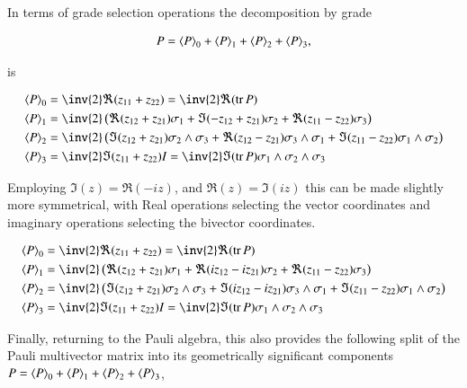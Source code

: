 \documentclass{article}
\DeclareMathOperator{\tr}{tr}
\newcommand{\trace}[1]{\tr{#1}}
\begin{document}
In terms of grade selection operations the decomposition by grade

\begin{align*}
P = {\left\langle{{P}}\right\rangle}_{0} +{\left\langle{{P}}\right\rangle}_{1} +{\left\langle{{P}}\right\rangle}_{2} +{\left\langle{{P}}\right\rangle}_{3},
\end{align*}

is

\begin{align*}
\gpgradezero{P} &= \inv{2} \Re( z_{11} + z_{22} ) = \inv{2} \Re(\trace P) \\
\gpgradeone{P} &= \inv{2} \left(
\Re( z_{12} + z_{21} ) \sigma_1
+\Im( -z_{12} + z_{21} ) \sigma_2
+\Re( z_{11} - z_{22} ) \sigma_3
\right) \\
\gpgradetwo{P}
&= \inv{2} \left(
\Im( z_{12} + z_{21} ) \sigma_2 \wedge \sigma_3
+\Re( z_{12} - z_{21} ) \sigma_3 \wedge \sigma_1
+\Im( z_{11} - z_{22} ) \sigma_1 \wedge \sigma_2
\right) \\
\gpgradethree{P} &= \inv{2} \Im( z_{11} + z_{22} ) I = \inv{2} \Im(\trace P) \sigma_1 \wedge \sigma_2 \wedge \sigma_3
\end{align*}

Employing $\Im(z) = \Re(-iz)$, and $\Re(z) = \Im(iz)$ this can be made slightly more symmetrical, with Real operations
selecting the vector coordinates and imaginary operations selecting the bivector coordinates.

\begin{align*}
\gpgradezero{P} &= \inv{2} \Re( z_{11} + z_{22} ) = \inv{2} \Re(\trace P) \\
\gpgradeone{P} &= \inv{2} \left(
\Re( z_{12} + z_{21} ) \sigma_1
+\Re( iz_{12} - iz_{21} ) \sigma_2
+\Re( z_{11} - z_{22} ) \sigma_3
\right) \\
\gpgradetwo{P}
&= \inv{2} \left(
\Im( z_{12} + z_{21} ) \sigma_2 \wedge \sigma_3
+\Im( iz_{12} - iz_{21} ) \sigma_3 \wedge \sigma_1
+\Im( z_{11} - z_{22} ) \sigma_1 \wedge \sigma_2
\right) \\
\gpgradethree{P} &= \inv{2} \Im( z_{11} + z_{22} ) I = \inv{2} \Im(\trace P) \sigma_1 \wedge \sigma_2 \wedge \sigma_3
\end{align*}

Finally, returning to the Pauli algebra, this also provides the following split of the Pauli multivector matrix into
its geometrically significant components
$P = {\left\langle{{P}}\right\rangle}_{0} +{\left\langle{{P}}\right\rangle}_{1} +{\left\langle{{P}}\right\rangle}_{2} +{\left\langle{{P}}\right\rangle}_{3}$,
\end{document}
